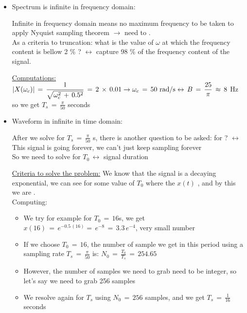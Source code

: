 \begin{itemize}
    
\item Spectrum is infinite in frequency domain:    
    
Infinite in frequency domain means no maximum frequency to be taken to apply Nyquist sampling theorem $\rightarrow$ need to .\\

As a criteria to truncation: what is the value of $\omega$ at which the frequency content is bellow 2 \% ? $\leftrightarrow$ capture 98 \% of the frequency content of the signal.

\underline{Computations:} $ \displaystyle\left\lvert X(\omega_c) \displaystyle\right\rvert \, = \, \displaystyle\frac{1}{\sqrt{ \omega^2_c\, + \, 0.5^2} } \, = \, 2 \, \times \, 0.01  \rightarrow \omega_c \, = \, 50 \text{ rad/s} \leftrightarrow \, B \, = \,  \displaystyle\frac{25}{\pi} \, \approx \, 8$ Hz so we get $T_s \, = \, \displaystyle\frac{\pi}{50}$ seconds\\  
    
\item Waveform in infinite in time domain:

After we solve for $T_s \, = \, \displaystyle\frac{\pi}{50}$ s, there is another question to be asked: for  ? $\leftrightarrow$ This signal is going forever, we can't just keep sampling forever\\

\newpage
So we need to solve for  $T_0 \, \leftrightarrow$  signal duration

\underline{Criteria to solve the problem:} We know that the signal is a decaying exponential, we can see for some value of $T_0$ where the   $x(t)$  , and by this we are .\\

Computing: 
	
	\begin{itemize}
	\item We try for example for $T_0 \, = \, 16$s, we get $x(16) \, = \, e^{-0.5 \, (16)} = \, e^{-8} \, = \, 3.3 \, e^{-4}$, very small number
	
	\item If we choose $T_0 \, = \, 16$, the number of sample we get in this period using a sampling rate $T_s \, = \, \displaystyle\frac{\pi}{50}$ is: $N_0 \, = \, \displaystyle\frac{T_0}{T_s} \, = \, 254.65$
	
	
	\item However, the number of samples we need to grab need to be integer, so let's say we need to grab 256 samples
	
	\item We resolve again for $T_s$ using $N_0 \, = \, 256$ samples, and we get $T_s \, = \, \displaystyle\frac{1}{16}$ seconds 
\end{itemize}

\end{itemize}

